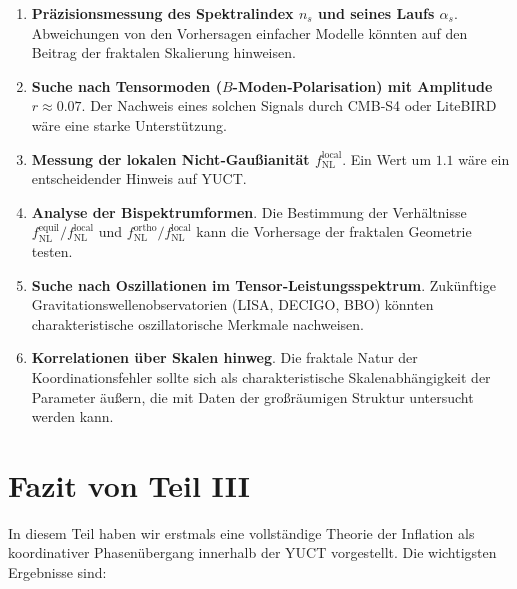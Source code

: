 \documentclass[11pt,a4paper]{article}
\begin{document}
	\begin{enumerate}
		\item \textbf{Präzisionsmessung des Spektralindex \(n_s\) und seines Laufs \(\alpha_s\)}. Abweichungen von den Vorhersagen einfacher Modelle könnten auf den Beitrag der fraktalen Skalierung hinweisen.
		\item \textbf{Suche nach Tensormoden (\(B\)-Moden‑Polarisation) mit Amplitude \(r \approx 0.07\)}. Der Nachweis eines solchen Signals durch CMB‑S4 oder LiteBIRD wäre eine starke Unterstützung.
		\item \textbf{Messung der lokalen Nicht‑Gaußianität \(f_{\text{NL}}^{\text{local}}\)}. Ein Wert um \(1.1\) wäre ein entscheidender Hinweis auf YUCT.
		\item \textbf{Analyse der Bispektrumformen}. Die Bestimmung der Verhältnisse \(f_{\text{NL}}^{\text{equil}}/f_{\text{NL}}^{\text{local}}\) und \(f_{\text{NL}}^{\text{ortho}}/f_{\text{NL}}^{\text{local}}\) kann die Vorhersage der fraktalen Geometrie testen.
		\item \textbf{Suche nach Oszillationen im Tensor‑Leistungsspektrum}. Zukünftige Gravitationswellenobservatorien (LISA, DECIGO, BBO) könnten charakteristische oszillatorische Merkmale nachweisen.
		\item \textbf{Korrelationen über Skalen hinweg}. Die fraktale Natur der Koordinationsfehler sollte sich als charakteristische Skalenabhängigkeit der Parameter äußern, die mit Daten der großräumigen Struktur untersucht werden kann.
	\end{enumerate}
	
	\section{Fazit von Teil III}
	\label{sec:conclusion-inflation}
	
	In diesem Teil haben wir erstmals eine vollständige Theorie der Inflation als koordinativer Phasenübergang innerhalb der YUCT vorgestellt. Die wichtigsten Ergebnisse sind:
	
\end{document}
